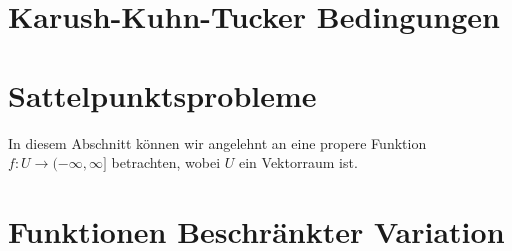 % 
% 
% 
% 

\section{Karush-Kuhn-Tucker Bedingungen}

\section{Sattelpunktsprobleme}
In diesem Abschnitt können wir angelehnt an \cite[S. 4ff., S. 165ff.]{Aub79}
eine propere Funktion $f:U\to (-\infty,\infty]$ betrachten, wobei $U$ ein
Vektorraum ist.

\section{Funktionen Beschränkter Variation}

